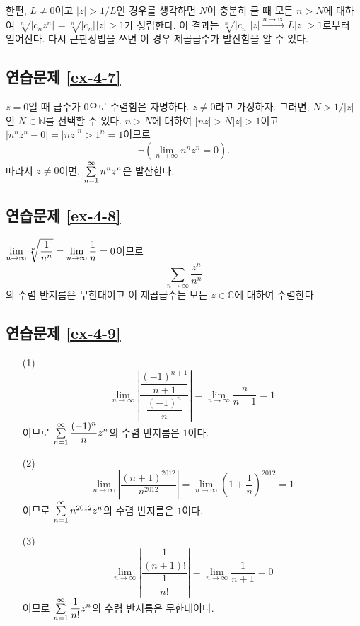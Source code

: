 한편, $L\ne0$이고 $|z|>1/L$인 경우를 생각하면
$N$이 충분히 클 때 모든 $n>N$에 대하여
$\sqrt[n]{|c_nz^n|}  = \sqrt[n]{|c_n|}|z| >1$가 성립한다.
이 결과는  $\sqrt[n]{|c_n|}|z| \xrightarrow{n\to\infty} L|z|>1$로부터 얻어진다.
다시 근판정법을 쓰면 이 경우 제곱급수가 발산함을 알 수 있다.

\subsection*{연습문제 \ref{ex-4-7}}

$z=0$일 때 급수가 $0$으로 수렴함은 자명하다.
$z\ne 0$라고 가정하자. 그러면, $N>1/|z|$인 
$N\in\mathbb N$를 선택할 수 있다.
$n>N$에 대하여 $|nz|>N|z|>1$이고
$|n^nz^n -0| = |nz|^n >1^n = 1$이므로
\[
\neg \left( \lim_{n\to\infty} n^n z^n = 0 \right).
\]
따라서 $z\ne0$이면, $\sum\limits_{n=1}^\infty n^n z^n$은 발산한다.

\subsection*{연습문제 \ref{ex-4-8}}

$\lim\limits_{n\to\infty} \sqrt[n]{\displaystyle\frac1{n^n}} = \lim\limits_{n\to\infty} \displaystyle\frac1n = 0$이므로
\[
\sum_{n\to\infty} \dfrac{z^n}{n^n}
\]
의 수렴 반지름은 무한대이고 이 제곱급수는 모든 $z\in\mathbb C$에 대하여 수렴한다.

\subsection*{연습문제 \ref{ex-4-9}}

\begin{itemize}
\item[(1)] 
\[
\lim_{n\to\infty} \left| \dfrac{\dfrac{(-1)^{n+1}}{n+1}}{\dfrac{(-1)^n}n} \right|
= \lim_{n\to\infty} \dfrac n{n+1} = 1
\]
이므로 $\sum\limits_{n=1}^\infty \displaystyle\frac{(-1)^n}n z^n$의 수렴 반지름은 $1$이다.

\item[(2)] 
\[
\lim_{n\to\infty} \left| \dfrac{(n+1)^{2012}}{n^{2012}} \right|
= \lim_{n\to\infty} \left( 1+ \dfrac1{n} \right)^{2012} = 1
\]
이므로 $\sum\limits_{n=1}^\infty n^ {2012} z^n$의 수렴 반지름은 $1$이다.

\item[(3)] 
\[
\lim_{n\to\infty} \left| \dfrac{\dfrac{1}{(n+1)!}}{\dfrac1{n!}} \right|
= \lim_{n\to\infty} \dfrac1{n+1} = 0
\]
이므로 $\sum\limits_{n=1}^\infty \displaystyle\frac1{n!}z^n$의 수렴 반지름은 무한대이다.
\end{itemize}

